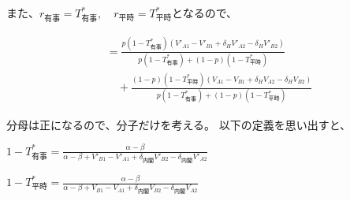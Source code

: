 \documentclass[main.tex]{subfiles}
\begin{document}
また、$r_{有事}=T^*_{有事}, \quad r_{平時} = T^*_{平時}$となるので、

\begin{align*}
    &= \frac{ p(1-T^*_{有事}) (V'_{A1} -V'_{B1} + \delta_H V'_{A2} - \delta_H V'_{B2})  }{ p(1-T^*_{有事})  + (1-p)(1-T^*_{平時}) }\\[1em]
    &\quad + \frac{ (1-p)(1-T^*_{平時})(V_{A1} - V_{B1} + \delta_H V_{A2} - \delta_H V_{B2} ) }{ p(1-T^*_{有事}) +  (1-p)(1-T^*_{平時}) }
\end{align*}


分母は正になるので、分子だけを考える。
以下の定義を思い出すと、

\begin{definition} \Large$1 - T^*_{有事} = \frac{ \alpha-\beta }{ \alpha-\beta + V'_{B1}-V'_{A1} + \delta_{内閣}V'_{B2} - \delta_{内閣}V'_{A2} }$ \end{definition}

\begin{definition} \Large$1 - T^*_{平時} = \frac{ \alpha-\beta }{ \alpha-\beta + V_{B1}-V_{A1} + \delta_{内閣}V_{B2} - \delta_{内閣}V_{A2} }$ \end{definition}
\end{document}
